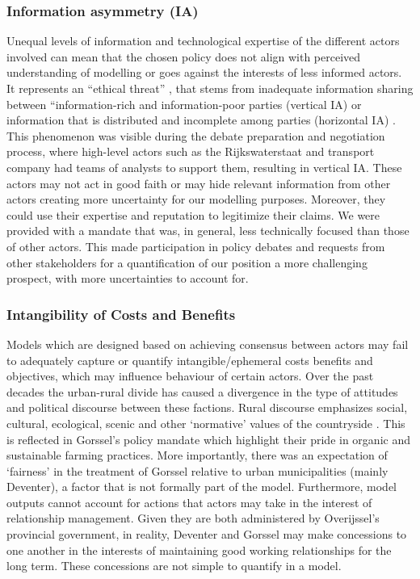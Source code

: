 \subsubsection{Information asymmetry (IA)}
Unequal levels of information and technological expertise of the different actors involved can mean that the chosen policy does not align with perceived understanding of modelling or goes against the interests of less informed actors. It represents an “ethical threat” \parencite{albertus_impact_2019}, that stems from inadequate information sharing between “information-rich and information-poor parties (vertical IA) or information that is distributed and incomplete among parties (horizontal IA) \parencite{clarkson_information_2007}. This phenomenon was visible during the debate preparation and negotiation process, where high-level actors such as the Rijkswaterstaat and transport company had teams of analysts to support them, resulting in vertical IA. These actors may not act in good faith or may hide relevant information from other actors creating more uncertainty for our modelling purposes. Moreover, they could use their expertise and reputation to legitimize their claims. We were provided with a mandate that was, in general, less technically focused than those of other actors. This made participation in policy debates and requests from other stakeholders for a quantification of our position a more challenging prospect, with more uncertainties to account for. 

\subsubsection{Intangibility of Costs and Benefits}
Models which are designed based on achieving consensus between actors may fail to adequately capture or quantify intangible/ephemeral costs benefits and objectives, which may influence behaviour of certain actors. Over the past decades the urban-rural divide has caused a divergence in the type of attitudes and political discourse between these factions. Rural discourse emphasizes social, cultural, ecological, scenic and other ‘normative’ values of the countryside \parencite{frouws_contested_1998, andersson_beyond_2009}. This is reflected in Gorssel’s policy mandate which highlight their pride in organic and sustainable farming practices. More importantly, there was an expectation of ‘fairness’ in the treatment of Gorssel relative to urban municipalities (mainly Deventer), a factor that is not formally part of the model. Furthermore, model outputs cannot account for actions that actors may take in the interest of relationship management. Given they are both administered by Overijssel’s provincial government, in reality, Deventer and Gorssel may make concessions to one another in the interests of maintaining good working relationships for the long term. These concessions are not simple to quantify in a model. 

